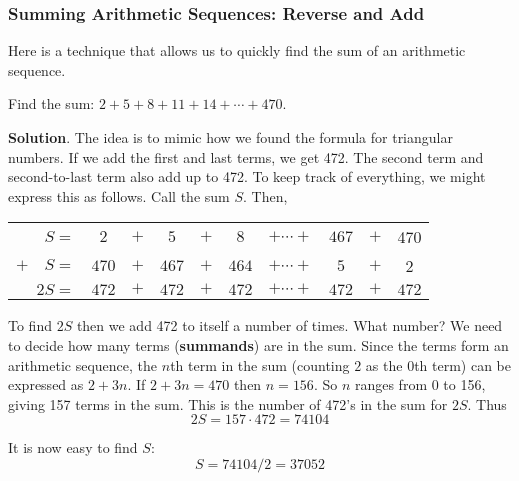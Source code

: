 \documentclass[11pt,]{book}
\newcommand{\terminology}[1]{\textbf{#1}}
\theoremstyle{ptxplainnotitle}
\theoremstyle{ptxplaintitle}
\theoremstyle{ptxdefinitionnotitle}
\theoremstyle{ptxdefinitiontitle}
\theoremstyle{ptxdefinitionnotitle}
\theoremstyle{ptxdefinitiontitle}
\theoremstyle{ptxdefinitionnotitle}
\theoremstyle{ptxdefinitiontitle}
\theoremstyle{ptxdefinitiontitlenonumber}
\theoremstyle{ptxdefinitiontitlenonumber}
\numberwithin{equation}{chapter}
\newcommand{\hrulethin}  {\noalign{\hrule height 0.04em}}
\begin{document}
\subsubsection[{Summing Arithmetic Sequences: Reverse and Add}]{Summing Arithmetic Sequences: Reverse and Add}\label{subsubsection-1}
\hypertarget{p-183}{}%
Here is a technique that allows us to quickly find the sum of an arithmetic sequence.%
\begin{example}\label{example-7}
\hypertarget{p-184}{}%
Find the sum: \(2 + 5 + 8 + 11 + 14 + \cdots + 470\).%
\par\smallskip%
\noindent\textbf{Solution}.\hypertarget{solution-13}{}\quad%
\hypertarget{p-185}{}%
The idea is to mimic how we found the formula for triangular numbers. If we add the first and last terms, we get 472. The second term and second-to-last term also add up to 472. To keep track of everything, we might express this as follows. Call the sum \(S\). Then,%
\begin{sidebyside}{1}{0}{0}{0}
\begin{sbspanel}{1}
{\centering%
\begin{tabular}{rccccccccc}
\(S  =\)&\(2\)&\(+\)&\(5\)&\(+\)&\(8\)&\(+ \cdots +\)&\(467\)&\(+\)&470\tabularnewline[0pt]
\(+ \quad S  =\)&\(470\)&\(+\)&\(467\)&\(+\)&\(464\)&\(+ \cdots +\)&\(5\)&\(+\)&2\tabularnewline\hrulethin
\(2S  =\)&\(472\)&\(+\)&\(472\)&\(+\)&\(472\)&\(+ \cdots +\)&\(472\)&\(+\)&\(472\)
\end{tabular}
\par}
\end{sbspanel}
\end{sidebyside}
\par
\hypertarget{p-186}{}%
To find \(2S\) then we add 472 to itself a number of times. What number? We need to decide how many terms (\terminology{summands}) are in the sum. Since the terms form an arithmetic sequence, the \(n\)th term in the sum (counting \(2\) as the 0th term) can be expressed as \(2 + 3n\). If \(2 + 3n = 470\) then \(n = 156\). So \(n\) ranges from 0 to 156, giving 157 terms in the sum. This is the number of 472's in the sum for \(2S\). Thus%
\begin{equation*}
2S = 157\cdot 472 = 74104
\end{equation*}
%
\par
\hypertarget{p-187}{}%
It is now easy to find \(S\):%
\begin{equation*}
S = 74104/2 = 37052
\end{equation*}
%
\end{example}
\end{document}
